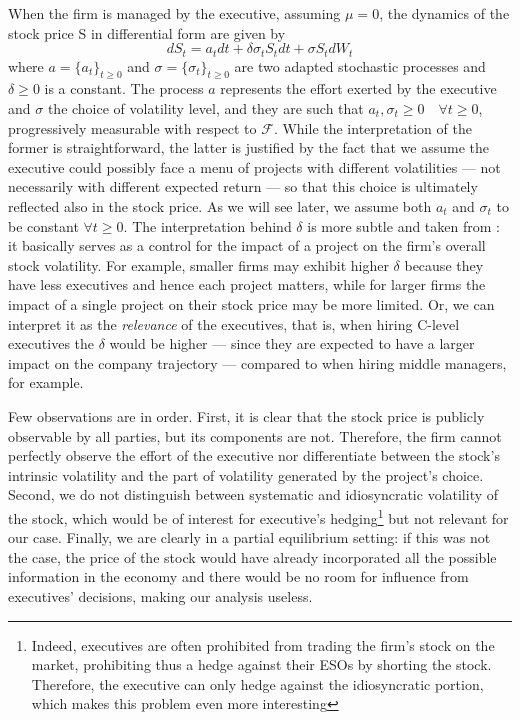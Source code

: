 When the firm is managed by the executive, assuming $\mu = 0$, the dynamics of the stock price S in differential form are given by 
$$ dS_t = a_t dt + \delta \sigma_t S_t dt + \sigma S_t dW_t $$
where $a = \{a_t\}_{t \ge 0}$ and $\sigma = \{\sigma_t\}_{t \ge 0}$ are two adapted stochastic processes and $\delta \ge 0$ is a constant. The process $a$ represents the effort exerted by the executive and $\sigma$ the choice of volatility level, and they are such that $a_t, \sigma_t \ge 0 \quad \forall t \ge 0$, progressively measurable with respect to $\mathscr{F}$. While the interpretation of the former is straightforward, the latter is justified by the fact that we assume the executive could possibly face a menu of projects with different volatilities --- not necessarily with different expected return --- so that this choice is ultimately reflected also in the stock price. As we will see later, we assume both $a_t$ and $\sigma_t$ to be constant $\forall t\ge0$.
The interpretation behind $\delta$ is more subtle and taken from \cite{cadenillas2005executive}: it basically serves as a control for the impact of a project on the firm's overall stock volatility. For example, smaller firms may exhibit higher $\delta$ because they have less executives and hence each project matters, while for larger firms the impact of a single project on their stock price may be more limited. Or, we can interpret it as the \textit{relevance} of the executives, that is, when hiring C-level executives the $\delta$ would be higher --- since they are expected to have a larger impact on the company trajectory --- compared to when hiring middle managers, for example.

Few observations are in order. First, it is clear that the stock price is publicly observable by all parties, but its components are not. Therefore, the firm cannot perfectly observe the effort of the executive nor differentiate between the stock's intrinsic volatility and the part of volatility generated by the project's choice. Second, we do not distinguish between systematic and idiosyncratic volatility of the stock, which would be of interest for executive's hedging\footnote{Indeed, executives are often prohibited from trading the firm's stock on the market, prohibiting thus a hedge against their ESOs by shorting the stock. Therefore, the executive can only hedge against the idiosyncratic portion, which makes this problem even more interesting} but not relevant for our case. Finally, we are clearly in a partial equilibrium setting: if this was not the case, the price of the stock would have already incorporated all the possible information in the economy and there would be no room for influence from executives' decisions, making our analysis useless.


